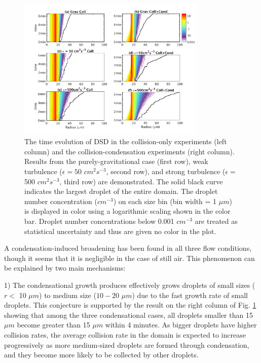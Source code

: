 \begin{figure}[ht]
\centering
\includegraphics[width=0.8\textwidth]{Figures/Chap4/DSD_evo.png}
\caption{The time evolution of DSD in the collision-only experiments (left column) and the collision-condensation experiments (right column). Results from the purely-gravitational case (first row), weak turbulence ($\epsilon=50$ $cm^2 s^{-3}$, second row), and strong turbulence ($\epsilon=$ 500  $cm^2 s^{-3}$, third row) are demonstrated. The solid black curve indicates the largest droplet of the entire domain. The droplet number concentration ($cm^{-3}$) on each size bin (bin width = 1 $\mu m$) is displayed in color using a logarithmic scaling shown in the color bar. Droplet number concentrations below 0.001 $cm^{-3}$ are treated as statistical uncertainty and thus are given no color in the plot.}\label{fig02}
\end{figure}

A condensation-induced broadening has been found in all three flow conditions, though it seems that it is negligible in the case of still air. This phenomenon can be explained by two main mechanisms:

1)	The condensational growth produces effectively grows droplets of small sizes ($r<$ 10 $\mu m$) to medium size ($10-20$ $\mu m$) due to the fast growth rate of small droplets. This conjecture is supported by the result on the right column of Fig. \ref{fig02} showing that among the three condensational cases, all droplets smaller than 15 $\mu m$ become greater than 15 $\mu m$ within 4 minutes. As bigger droplets have higher collision rates, the average collision rate in the domain is expected to increase progressively as more medium-sized droplets are formed through condensation, and they become more likely to be collected by other droplets.

